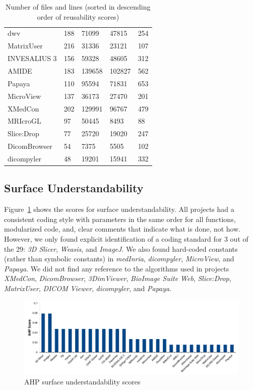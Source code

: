 \documentclass[11pt]{article}
\begin{document}
\begin{table}[!ht]
\begin{tabular}{lllll}
dwv & 188 & 71099 & 47815 & 254 \\
MatrixUser & 216 & 31336 & 23121 & 107 \\
INVESALIUS 3 & 156 & 59328 & 48605 & 312 \\
AMIDE & 183 & 139658 & 102827 & 562 \\
Papaya & 110 & 95594 & 71831 & 653 \\
MicroView & 137 & 36173 & 27470 & 201 \\
XMedCon & 202 & 129991 & 96767 & 479 \\
MRIcroGL & 97 & 50445 & 8493 & 88 \\
Slice:Drop & 77 & 25720 & 19020 & 247 \\
DicomBrowser & 54 & 7375 & 5505 & 102 \\
dicompyler & 48 & 19201 & 15941 & 332 \\ 
\bottomrule
\end{tabular}
\caption{Number of files and lines (sorted in descending order of reusability
scores)}
\label{tab_loc_per_file}
\end{table}

\subsection{Surface Understandability} \label{sec_result_understandability}

Figure~\ref{fg_surface_understandability_scores} shows the scores for surface
understandability. All projects had a consistent coding style with parameters in
the same order for all functions, modularized code, and, clear comments that
indicate what is done, not how. However, we only found explicit identification
of a coding standard for 3 out of the 29: \textit{3D Slicer}, \textit{Weasis},
and \textit{ImageJ}. We also found hard-coded constants (rather than symbolic
constants) in \textit{medInria}, \textit{dicompyler}, \textit{MicroView}, and
\textit{Papaya}. We did not find any reference to the algorithms used in
projects \textit{XMedCon}, \textit{DicomBrowser}, \textit{3DimViewer},
\textit{BioImage Suite Web}, \textit{Slice:Drop}, \textit{MatrixUser},
\textit{DICOM Viewer}, \textit{dicompyler}, and \textit{Papaya}. 

\begin{figure}[!ht]
\includegraphics[scale=0.47]{understandability_scores.pdf}
\caption{AHP surface understandability scores}
\label{fg_surface_understandability_scores}
\end{figure}
\end{document}
